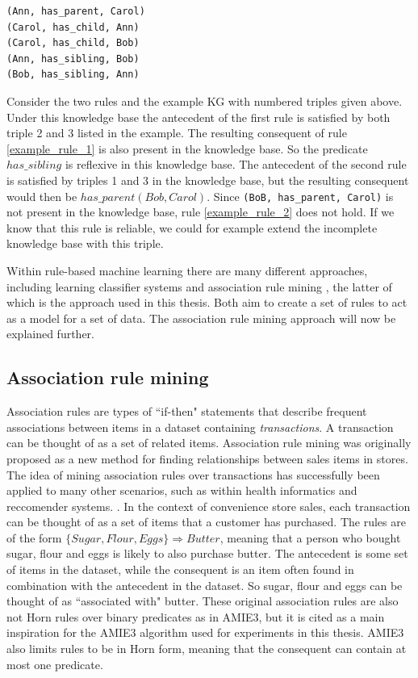 \begin{example}[A simple KG.]
\begin{lstlisting}[]
(Ann, has_parent, Carol)
(Carol, has_child, Ann)
(Carol, has_child, Bob)
(Ann, has_sibling, Bob)
(Bob, has_sibling, Ann)
\end{lstlisting}
\label{mini_KG_rules}
\end{example}


Consider the two rules and the example KG with numbered triples given above. Under this knowledge base the antecedent of the first rule is satisfied by both triple 2 and 3 listed in the example. The resulting consequent of rule \ref{example_rule_1} is also present in the knowledge base. So the predicate $has\_sibling$ is reflexive in this knowledge base. The antecedent of the second rule is satisfied by triples 1 and 3 in the knowledge base, but the resulting consequent would then be $has\_parent(Bob, Carol)$. Since \texttt{(BoB, has\_parent, Carol)} is not present in the knowledge base, rule \ref{example_rule_2} does not hold. If we know that this rule is reliable, we could for example extend the incomplete knowledge base with this triple.

Within rule-based machine learning there are many different approaches, including learning classifier systems \cite{sigaud2007learning} and association rule mining \cite{agrawal1993mining}, the latter of which is the approach used in this thesis. Both aim to create a set of rules to act as a model for a set of data. The association rule mining approach will now be explained further.


\subsection{Association rule mining}
Association rules \cite{agrawal1993mining} are types of ``if-then" statements that describe frequent associations between items in a dataset containing \textit{transactions}. A transaction can be thought of as a set of related items. Association rule mining was originally proposed as a new method for finding relationships between sales items in stores. The idea of mining association rules over transactions has successfully been applied to many other scenarios, such as within health informatics and reccomender systems. \cite{altaf2017applications, lin2002efficient}. In the context of convenience store sales, each transaction can be thought of as a set of items that a customer has purchased. The rules are of the form $\{Sugar, Flour, Eggs\} \Rightarrow Butter$, meaning that a person who bought sugar, flour and eggs is likely to also purchase butter. The antecedent is some set of items in the dataset, while the consequent is an item often found in combination with the antecedent in the dataset.  So sugar, flour and eggs can be thought of as ``associated with" butter. These original association rules are also not Horn rules over binary predicates as in AMIE3, but it is cited as a main inspiration for the AMIE3 algorithm used for experiments in this thesis. AMIE3 also limits rules to be in Horn form, meaning that the consequent can contain at most one predicate.

